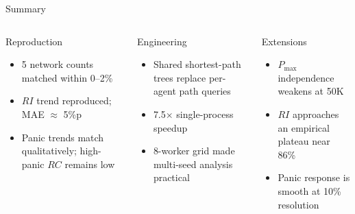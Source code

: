 \documentclass[aspectratio=169, xcolor=table]{beamer}
\begin{document}
\begin{frame}[t]{Summary}
\footnotesize

\begin{columns}[T,onlytextwidth]
\begin{block}{\small Reproduction}
\scriptsize
\begin{itemize}\itemsep0.25em
  \item 5 network counts matched within 0--2\%
  \item $RI$ trend reproduced; MAE $\approx$ 5\%p
  \item Panic trends match qualitatively; high-panic $RC$ remains low
\end{itemize}
\end{block}

\begin{block}{\small Engineering}
\scriptsize
\begin{itemize}\itemsep0.25em
  \item Shared shortest-path trees replace per-agent path queries
  \item 7.5$\times$ single-process speedup
  \item 8-worker grid made multi-seed analysis practical
\end{itemize}
\end{block}

\begin{alertblock}{\small Extensions}
\scriptsize
\begin{itemize}\itemsep0.25em
  \item $P_{\max}$ independence weakens at 50K
  \item $RI$ approaches an empirical plateau near 86\%
  \item Panic response is smooth at 10\% resolution
\end{itemize}
\end{alertblock}
\end{columns}

\vspace{0.7em}
\begin{center}
\end{center}


\end{frame}
\end{document}
